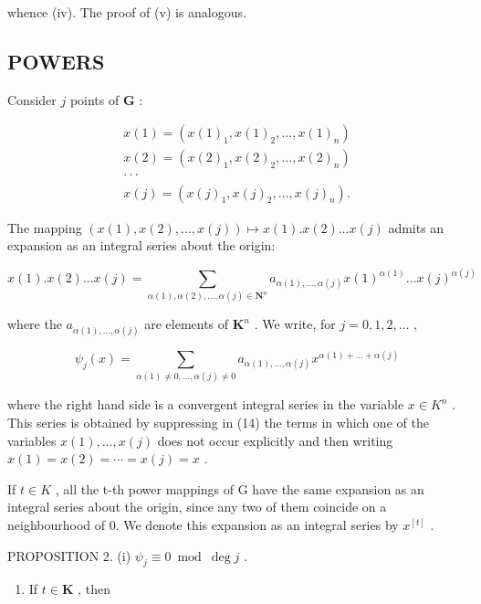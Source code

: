 whence (iv). The proof of (v) is analogous.

\subsection{POWERS}

Consider \(j\) points of \(\mathbf{G}\) :

\[
\begin{array}{l} x (1) = (x (1) _ {1}, x (1) _ {2}, \ldots , x (1) _ {n}) \\ x (2) = (x (2) _ {1}, x (2) _ {2}, \ldots , x (2) _ {n}) \\ \cdot \cdot \cdot \\ x (j) = (x (j) _ {1}, x (j) _ {2}, \ldots , x (j) _ {n}). \end{array}
\]

The mapping \((x(1), x(2), \ldots, x(j)) \mapsto x(1).x(2) \ldots x(j)\) admits an expansion as an integral series about the origin:

\[
x (1). x (2) \dots x (j) = \sum_ {\alpha (1), \alpha (2), \dots , \alpha (j) \in \mathbf {N} ^ {n}} a _ {\alpha (1), \dots , \alpha (j)} x (1) ^ {\alpha (1)} \dots x (j) ^ {\alpha (j)}\tag{14}
\]

where the \(a_{\alpha(1), \ldots, \alpha(j)}\) are elements of \(\mathbf{K}^n\) . We write, for \(j = 0, 1, 2, \ldots\) ,

\[
\psi_ {j} (x) = \sum_ {\alpha (1) \neq 0, \dots , \alpha (j) \neq 0} a _ {\alpha (1), \dots , \alpha (j)} x ^ {\alpha (1) + \dots + \alpha (j)}\tag{15}
\]

where the right hand side is a convergent integral series in the variable \(x \in K^{n}\) . This series is obtained by suppressing in (14) the terms in which one of the variables \(x(1), \ldots, x(j)\) does not occur explicitly and then writing \(x(1) = x(2) = \cdots = x(j) = x\) .

If \(t \in K\) , all the t-th power mappings of G have the same expansion as an integral series about the origin, since any two of them coincide on a neighbourhood of 0. We denote this expansion as an integral series by \(x^{[t]}\) .

PROPOSITION 2. (i) \(\psi_{j} \equiv 0 \bmod \deg j\) .

\begin{enumerate}
\def\labelenumi{(\roman{enumi})}
\setcounter{enumi}{1}
\tightlist
\item
  If \(t\in \mathbf{K}\) , then
\end{enumerate}

